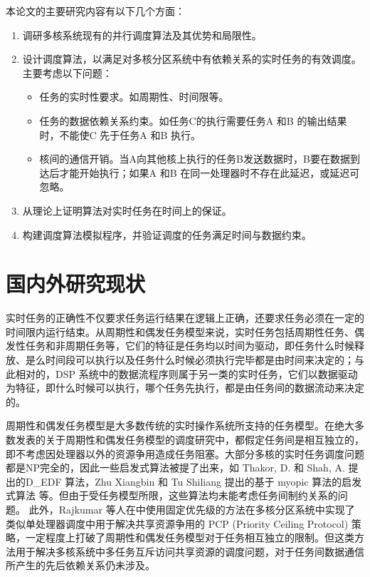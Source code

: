 本论文的主要研究内容有以下几个方面：
\begin{enumerate}
\item	调研多核系统现有的并行调度算法及其优势和局限性。
\item	设计调度算法，以满足对多核分区系统中有依赖关系的实时任务的有效调度。主要考虑以下问题：
  \begin{itemize}
    \item	任务的实时性要求。如周期性、时间限等。
    \item	任务的数据依赖关系约束。如任务C的执行需要任务A 和B 的输出结果时，不能使C 先于任务A 和B 执行。
    \item	核间的通信开销。当A向其他核上执行的任务B发送数据时，B要在数据到达后才能开始执行；如果A 和B 在同一处理器时不存在此延迟，或延迟可忽略。
  \end{itemize}
\item	从理论上证明算法对实时任务在时间上的保证。
\item	构建调度算法模拟程序，并验证调度的任务满足时间与数据约束。%
\end{enumerate}

\section{国内外研究现状}

实时任务的正确性不仅要求任务运行结果在逻辑上正确，还要求任务必须在一定的时间限内运行结束。从周期性和偶发任务模型来说，实时任务包括周期性任务、偶发性任务和非周期任务等，它们的特征是任务均以时间为驱动，即任务什么时候释放、是么时间段可以执行以及任务什么时候必须执行完毕都是由时间来决定的；与此相对的，DSP 系统中的数据流程序则属于另一类的实时任务，它们以数据驱动为特征，即什么时候可以执行，哪个任务先执行，都是由任务间的数据流动来决定的。

周期性和偶发任务模型是大多数传统的实时操作系统所支持的任务模型。在绝大多数发表的关于周期性和偶发任务模型的调度研究中，都假定任务间是相互独立的，即不考虑因处理器以外的资源争用造成任务阻塞。大部分多核的实时任务调度问题都是NP完全的，因此一些启发式算法被提了出来，如 Thakor, D. 和 Shah, A. 提出的D\_EDF 算法，Zhu Xiangbin 和 Tu Shiliang 提出的基于 myopic 算法的启发式算法 等。但由于受任务模型所限，这些算法均未能考虑任务间制约关系的问题。 %
此外，Rajkumar 等人在\cite{Contention}中使用固定优先级的方法在多核分区系统中实现了类似单处理器调度中用于解决共享资源争用的 PCP (Priority Ceiling Protocol) 策略，一定程度上打破了周期性和偶发任务模型对于任务相互独立的限制。但这类方法用于解决多核系统中多任务互斥访问共享资源的调度问题，对于任务间数据通信所产生的先后依赖关系仍未涉及。



